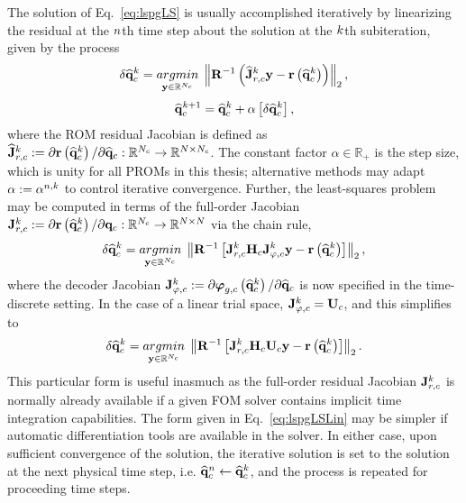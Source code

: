 The solution of Eq.~\ref{eq:lspgLS} is usually accomplished iteratively by linearizing the residual at the $n$th time step about the solution at the $k$th subiteration, given by the process
%
\begin{equation}\label{eq:lspgLSLin}
    \delta \consVecCoef^{\newtonIdx} = \argmin{\dummyVec \inROne{\numConsModes}} \left\Vert \resScaleInv \left(\jacobResCoefCons^{\newtonIdx} \dummyVec - \resFunc{\consVecCoef^{\newtonIdx}}\right) \right\Vert_2,
\end{equation}
\begin{equation}
    \mathbf{\widehat{q}}_{c}^{k + 1} = \mathbf{\widehat{q}}_{c}^{k} + \alpha \left[ \delta \mathbf{\widehat{q}}_{c}^{k} \right],
\end{equation}
%
where the ROM residual Jacobian is defined as $\mathbf{\widehat{J}}_{r,c}^{k} := \partial \mathbf{r}\left(\mathbf{\widehat{q}}_{c}^{k}\right) / \partial \mathbf{\widehat{q}}_{c}: \mathbb{R}^{N_c} \rightarrow \mathbb{R}^{N \times N_c}$. The constant factor $\alpha \in \mathbb{R}_+$ is the step size, which is unity for all PROMs in this thesis; alternative methods may adapt $\alpha := \alpha^{n,k}$ to control iterative convergence. Further, the least-squares problem may be computed in terms of the full-order Jacobian $\mathbf{J}_{r,c}^{k} := \partial \mathbf{r}\left(\mathbf{\widehat{q}}_{c}^{k}\right) / \partial \mathbf{q}_{c}: \mathbb{R}^{N_c} \rightarrow \mathbb{R}^{N \times N}$ via the chain rule,
%
\begin{equation}
    \delta \consVecCoef^{\newtonIdx} = \argmin{\dummyVec \inROne{\numConsModes}} \left\Vert \resScaleInv \left[\jacobResCons^{\newtonIdx} \consScale \jacobTrialCons^{\newtonIdx} \dummyVec - \resFunc{\consVecCoef^{\newtonIdx}}\right] \right\Vert_2,
\end{equation}
%
where the decoder Jacobian $\mathbf{J}_{\varphi,c}^{k} := \partial \boldsymbol{\varphi}_{g, c}\left(\mathbf{\widehat{q}}_{c}^{k}\right) / \partial \mathbf{\widehat{q}}_{c}$ is now specified in the time-discrete setting. In the case of a linear trial space, $\jacobTrialCons^{\newtonIdx} = \consTrial$, and this simplifies to
%
\begin{equation}
    \delta \consVecCoef^{\newtonIdx} = \argmin{\dummyVec \inROne{\numConsModes}} \left\Vert \resScaleInv \left[\jacobResCons^{\newtonIdx} \consScale \consTrial \dummyVec - \resFunc{\consVecCoef^{\newtonIdx}}\right] \right\Vert_2.
\end{equation}
%
This particular form is useful inasmuch as the full-order residual Jacobian $\mathbf{J}_{r,c}^{k}$ is normally already available if a given FOM solver contains implicit time integration capabilities. The form given in Eq.~\ref{eq:lspgLSLin} may be simpler if automatic differentiation tools are available in the solver. In either case, upon sufficient convergence of the solution, the iterative solution is set to the solution at the next physical time step, i.e. $\mathbf{\widehat{q}}_{c}^{n} \leftarrow \mathbf{\widehat{q}}_{c}^{k}$, and the process is repeated for proceeding time steps.


